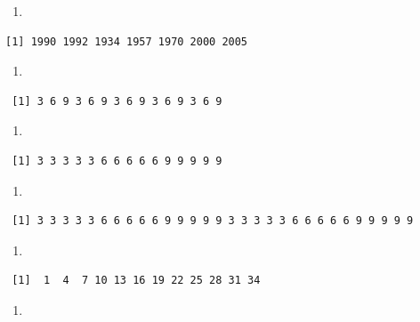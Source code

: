 \documentclass[
  letterpaper,
  DIV=11,
  numbers=noendperiod]{scrreprt}
\providecommand{\tightlist}{%
  \setlength{\itemsep}{0pt}\setlength{\parskip}{0pt}}\usepackage{longtable,booktabs,array}
\begin{document}
\begin{enumerate}
\def\labelenumi{\roman{enumi}.}
\tightlist
\item
\end{enumerate}

\begin{verbatim}
[1] 1990 1992 1934 1957 1970 2000 2005
\end{verbatim}

\begin{enumerate}
\def\labelenumi{\roman{enumi}.}
\setcounter{enumi}{1}
\tightlist
\item
\end{enumerate}

\begin{verbatim}
 [1] 3 6 9 3 6 9 3 6 9 3 6 9 3 6 9
\end{verbatim}

\begin{enumerate}
\def\labelenumi{\roman{enumi}.}
\setcounter{enumi}{2}
\tightlist
\item
\end{enumerate}

\begin{verbatim}
 [1] 3 3 3 3 3 6 6 6 6 6 9 9 9 9 9
\end{verbatim}

\begin{enumerate}
\def\labelenumi{\roman{enumi}.}
\setcounter{enumi}{3}
\tightlist
\item
\end{enumerate}

\begin{verbatim}
 [1] 3 3 3 3 3 6 6 6 6 6 9 9 9 9 9 3 3 3 3 3 6 6 6 6 6 9 9 9 9 9
\end{verbatim}

\begin{enumerate}
\def\labelenumi{\alph{enumi}.}
\setcounter{enumi}{21}
\tightlist
\item
\end{enumerate}

\begin{verbatim}
 [1]  1  4  7 10 13 16 19 22 25 28 31 34
\end{verbatim}

\begin{enumerate}
\def\labelenumi{\roman{enumi}.}
\setcounter{enumi}{5}
\tightlist
\item
\end{enumerate}
\end{document}
